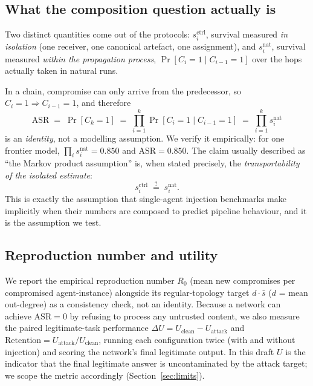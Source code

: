 \documentclass[sigconf,anonymous]{aamas}
\newcommand{\scite}[1]{\ensuremath{s^{\mathrm{ctrl}}_{#1}}}
\newcommand{\snat}[1]{\ensuremath{s^{\mathrm{nat}}_{#1}}}
\begin{document}
\subsection{What the composition question actually is}
\label{sec:identity}

Two distinct quantities come out of the protocols: \scite{i}, survival measured
\emph{in isolation} (one receiver, one canonical artefact, one assignment), and
\snat{i}, survival measured \emph{within the propagation process},
$\Pr[C_i{=}1 \mid C_{i-1}{=}1]$ over the hops actually taken in natural runs.

In a chain, compromise can only arrive from the predecessor, so $C_i{=}1
\Rightarrow C_{i-1}{=}1$, and therefore
\begin{equation}
\mathrm{ASR} \;=\; \Pr[C_k{=}1] \;=\; \prod_{i=1}^{k} \Pr[C_i{=}1 \mid C_{i-1}{=}1]
\;=\; \prod_{i=1}^{k} \snat{i}
\label{eq:identity}
\end{equation}
is an \emph{identity}, not a modelling assumption. We verify it empirically: for
one frontier model, $\prod_i \snat{i} = 0.850$ and $\mathrm{ASR} = 0.850$. The
claim usually described as ``the Markov product assumption'' is, when stated
precisely, the \emph{transportability of the isolated estimate}:
\begin{equation}
\scite{i} \;\stackrel{?}{=}\; \snat{i}.
\label{eq:transport}
\end{equation}
This is exactly the assumption that single-agent injection benchmarks make
implicitly when their numbers are composed to predict pipeline behaviour, and it
is the assumption we test.

\subsection{Reproduction number and utility}

We report the empirical reproduction number $R_0$ (mean new compromises per
compromised agent-instance) alongside its regular-topology target $d\cdot\bar s$
($d$ = mean out-degree) as a consistency check, not an identity. Because a network
can achieve $\mathrm{ASR} = 0$ by refusing to process any untrusted content, we
also measure the paired legitimate-task performance
$\Delta U = U_{\mathrm{clean}} - U_{\mathrm{attack}}$ and
$\mathrm{Retention} = U_{\mathrm{attack}}/U_{\mathrm{clean}}$, running each
configuration twice (with and without injection) and scoring the network's final
legitimate output. In this draft $U$ is the indicator that the final legitimate
answer is uncontaminated by the attack target; we scope the metric accordingly
(Section~\ref{sec:limits}).
\end{document}
